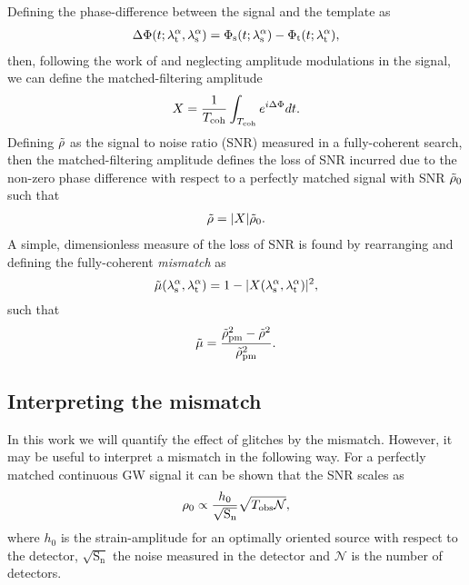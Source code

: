 \documentclass[../full_thesis/full_thesis.tex]{subfiles}
\begin{document}
Defining the phase-difference between the signal and the template as
\begin{align}
\Delta\Phi(t; {\lambda}_\textrm{t}^{\alpha}, {\lambda}_\textrm{s}^{\alpha}) = \Phi_{\textrm{s}}(t; {\lambda}_\textrm{s}^{\alpha}) - \Phi_{\textrm{t}}(t; {\lambda}_\textrm{t}^{\alpha}),
\label{eqn: phase diff}
\end{align}
then, following the work of \citet{Prix2005} and neglecting amplitude modulations
in the signal, we can define the matched-filtering amplitude
\begin{equation}
X = \frac{1}{T_{\mathrm{coh}}}\int_{T_{\mathrm{coh}}}e^{i\Delta\Phi} dt.
\label{eqn: matched filtering amplitude}
\end{equation}
Defining $\tilde{\rho}$ as the signal to noise ratio (SNR) measured in a fully-coherent
search, then the matched-filtering amplitude defines the loss of SNR incurred
due to the non-zero phase difference with respect to a perfectly matched signal
with SNR $\tilde{\rho}_{0}$ such that
\begin{align}
\tilde{\rho} = |X|\tilde{\rho}_{0}.
\end{align}
A simple, dimensionless measure of the loss of SNR is found by rearranging
and defining the fully-coherent \emph{mismatch} as
\begin{equation}
\tilde{\mu}({\lambda}_\textrm{s}^{\alpha}, {\lambda}_\textrm{t}^{\alpha}) = 1 - |X({\lambda}_\textrm{s}^{\alpha}, {\lambda}_\textrm{t}^{\alpha})|^{2},
\label{eqn: full mismatch}
\end{equation}
such that
\begin{equation}
\tilde{\mu} = \frac{\tilde{\rho}_{\mathrm{pm}}^{2} - \tilde{\rho}^{2}}
                {\tilde{\rho}^{2}_{\mathrm{pm}}}.
\label{eqn: numeric mismatch}
\end{equation}

\subsection{Interpreting the mismatch}
In this work we will quantify the effect of glitches by the mismatch. However,
it may be useful to interpret a mismatch in the following way. For a perfectly
matched continuous GW signal it can be shown \citep{Jaranowski1998} that the SNR scales as
\begin{equation}
\rho_{0} \propto \frac{h_{0}}{\sqrt{\textrm{S}_{\textrm{n}}}}
                               \sqrt{T_{\mathrm{obs}} \mathcal{N}},
\end{equation}
where $h_{0}$ is the strain-amplitude for an optimally oriented source with
respect to the detector, $\sqrt{\textrm{S}_{\textrm{n}}}$ the noise measured
in the detector and $\mathcal{N}$ is the number of detectors.
\end{document}
